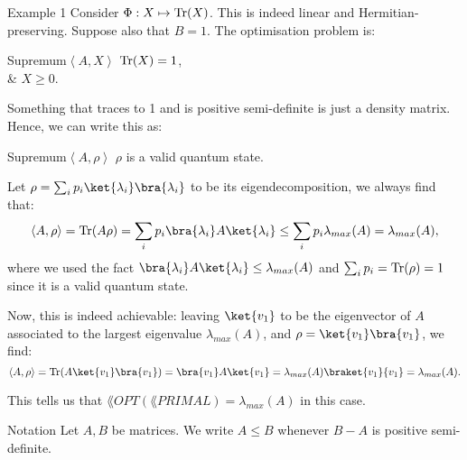 \documentclass[a4paper]{article}
\begin{document}
\begin{parag}{Example 1}
    Consider $\Phi: X \mapsto \Tr\left(X\right)$. This is indeed linear and Hermitian-preserving. Suppose also that $B = 1$. The  optimisation problem is:
    \begin{semidefiniteprogram}{Supremum}{$\left\langle A, X \right\rangle$}
        $\Tr\left(X\right) = 1$,\\
        & $X \geq 0$.
    \end{semidefiniteprogram}

    Something that traces to 1 and is positive semi-definite is just a density matrix. Hence, we can write this as:
    \begin{semidefiniteprogram}{Supremum}{$\left\langle A, \rho \right\rangle$}
        $\rho$ is a valid quantum state.
    \end{semidefiniteprogram}

    Let $\rho = \sum_{i} p_i \ket{\lambda_i}\bra{\lambda_i}$ to be its eigendecomposition, we always find that: 
    \[\left\langle A, \rho \right\rangle = \Tr\left(A \rho\right) = \sum_{i} p_i \bra{\lambda_i} A \ket{\lambda_i} \leq \sum_{i} p_i \lambda_{max}\left(A\right) = \lambda_{max}\left(A\right),\]
    where we used the fact $\bra{\lambda_i} A \ket{\lambda_i} \leq \lambda_{max}\left(A\right)$ and $\sum_{i} p_i = \Tr\left(\rho\right) = 1$ since it is a valid quantum state.

    Now, this is indeed achievable: leaving $\ket{v_1}$ to be the eigenvector of $A$ associated to the largest eigenvalue $\lambda_{max}\left(A\right)$, and $\rho = \ket{v_1}\bra{v_1}$, we find: 
    \[\left\langle A, \rho \right\rangle = \Tr\left(A \ket{v_1}\bra{v_1}\right) = \bra{v_1} A \ket{v_1} = \lambda_{max}\left(A\right) \braket{v_1}{v_1} = \lambda_{max}\left(A\right).\]
    
    This tells us that $\lang{OPT}\left(\lang{PRIMAL}\right) = \lambda_{max}\left(A\right)$ in this case.
\end{parag}

\begin{parag}{Notation}
    Let $A, B$ be matrices. We write $A \leq B$ whenever $B - A$ is positive semi-definite.
\end{parag}
\end{document}
